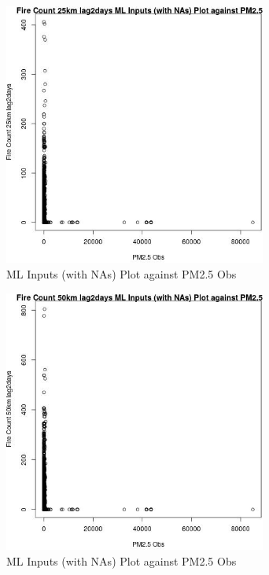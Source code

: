 \begin{figure} 
\centering  
\includegraphics[width=0.77\textwidth]{Code_Outputs/Report_ML_input_PM25_Step4_part_f_de_duplicated_aveswNAs_Fire_Count_25km_lag2daysvPM25_Obs.jpg} 
\caption{\label{fig:Report_ML_input_PM25_Step4_part_f_de_duplicated_aveswNAsFire_Count_25km_lag2daysvPM25_Obs}ML Inputs (with NAs) Plot against PM2.5 Obs} 
\end{figure} 
 

\clearpage 

\begin{figure} 
\centering  
\includegraphics[width=0.77\textwidth]{Code_Outputs/Report_ML_input_PM25_Step4_part_f_de_duplicated_aveswNAs_Fire_Count_50km_lag2daysvPM25_Obs.jpg} 
\caption{\label{fig:Report_ML_input_PM25_Step4_part_f_de_duplicated_aveswNAsFire_Count_50km_lag2daysvPM25_Obs}ML Inputs (with NAs) Plot against PM2.5 Obs} 
\end{figure} 
 

